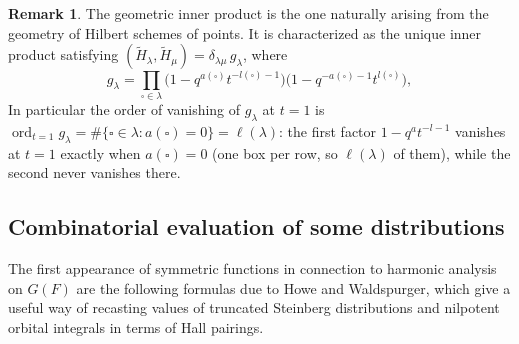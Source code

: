 \documentclass{amsart}
\numberwithin{equation}{section}
\theoremstyle{definition}
\newtheorem{example}[lemma]{Example}%
\newtheorem{remark}[lemma]{Remark}%
\newcommand{\tH}{\widetilde{H}}
\begin{document}
\begin{remark}\label{rmk:glambda}
The geometric inner product is the one naturally arising from the geometry of Hilbert schemes of points. It is characterized as the unique inner product satisfying $(\tH_\lambda,\tH_\mu)=\delta_{\lambda\mu}\,g_\lambda$, where
\begin{equation}
    \label{eq:glambda}
    g_\lambda=\prod_{\square\in\lambda}\bigl(1-q^{a(\square)}t^{-l(\square)-1}\bigr)\bigl(1-q^{-a(\square)-1}t^{l(\square)}\bigr),
\end{equation}
 In particular the order of vanishing of $g_\lambda$ at $t=1$ is $\operatorname{ord}_{t=1}g_\lambda=\#\{\square\in\lambda: a(\square)=0\}=\ell(\lambda)$: the first factor $1-q^{a}t^{-l-1}$ vanishes at $t=1$ exactly when $a(\square)=0$ (one box per row, so $\ell(\lambda)$ of them), while the second never vanishes there.
\end{remark}


\subsection{Combinatorial evaluation of some distributions}
The first appearance of symmetric functions in connection to harmonic analysis on $G(F)$ are the following formulas due to Howe and Waldspurger, which give a useful way of recasting values of truncated Steinberg distributions and nilpotent orbital integrals in terms of Hall pairings.
\end{document}
